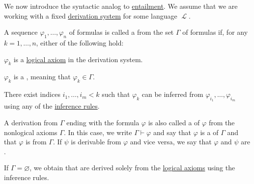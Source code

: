 \begin{definition}\label{def:first_order_derivability}
  We now introduce the syntactic analog to \hyperref[def:first_order_semantics/entailment]{entailment}. We assume that we are working with a fixed \hyperref[def:first_order_derivation_system]{derivation system} for some language \( \mscrL \).

 A sequence \( \varphi_1, \ldots, \varphi_n \) of formulas is called a  from the set \( \Gamma \) of formulas if, for any \( k = 1, \ldots, n \), either of the following hold:
  \begin{thmenum}
     \( \varphi_k \) is a \hyperref[def:first_order_derivation_system/axioms]{logical axiom} in the derivation system.

     \( \varphi_k \) is a , meaning that \( \varphi_k \in \Gamma \).

     There exist indices \( i_1, \ldots, i_m < k \) such that \( \varphi_k \) can be inferred from \( \varphi_{i_1}, \ldots, \varphi_{i_m} \) using any of the \hyperref[def:first_order_derivation_system/rules]{inference rules}.
  \end{thmenum}

  A derivation from \( \Gamma \) ending with the formula \( \varphi \) is also called a  of \( \varphi \) from the nonlogical axioms \( \Gamma \). In this case, we write \( \Gamma \vdash \varphi \) and say that \( \varphi \) is a  of \( \Gamma \) and that \( \varphi \) is  from \( \Gamma \). If \( \psi \) is derivable from \( \varphi \) and vice versa, we say that \( \varphi \) and \( \psi \) are .

  If \( \Gamma = \varnothing \), we obtain  that are derived solely from the \hyperref[def:first_order_derivation_system/axioms]{logical axioms} using the inference rules.
\end{definition}

